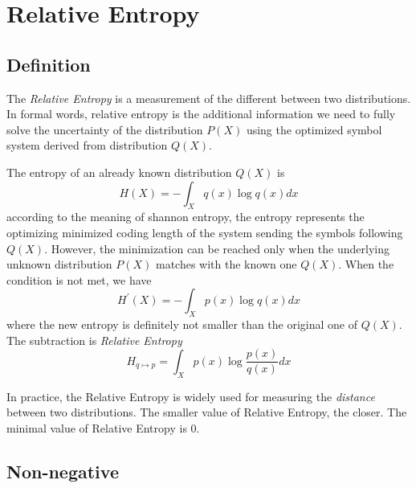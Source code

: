 \documentclass[a4paper]{article}
\begin{document}
\section{Relative Entropy}

\subsection{Definition}

The \emph{Relative Entropy} is a measurement of the different between two distributions.
In formal words, relative entropy is the additional information we need to fully solve the uncertainty of the distribution $P(X)$ using the optimized symbol system derived from distribution $Q(X)$.

The entropy of an already known distribution $Q(X)$ is
\begin{equation*}
    H(X) = - \int_{X} q(x) \log{q(x)} dx
\end{equation*}
according to the meaning of shannon entropy, the entropy represents the optimizing minimized coding length of the system sending the symbols following $Q(X)$.
However, the minimization can be reached only when the underlying unknown distribution $P(X)$ matches with the known one $Q(X)$.
When the condition is not met, we have
\begin{equation}
    H^{'}(X) = - \int_{X} p(x) \log{q(x)} dx
\end{equation}
where the new entropy is definitely not smaller than the original one of $Q(X)$. The subtraction is \emph{Relative Entropy}
\begin{equation}
    H_{q \mapsto p} = \int_{X} p(x) \log{\frac{p(x)}{q(x)}} dx
    \label{eq: Relative Entropy}
\end{equation}

In practice, the Relative Entropy is widely used for measuring the \emph{distance} between two distributions. The smaller value of Relative Entropy, the closer. The minimal value of Relative Entropy is $0$.

\subsection{Non-negative}
\end{document}
